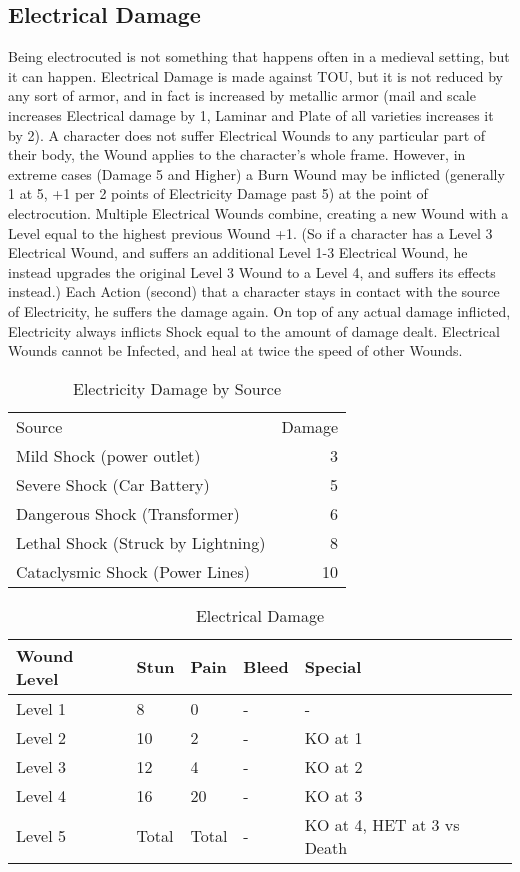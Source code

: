 \documentclass[oneside,11pt,english]{book}
\begin{document}
\subsection{Electrical Damage}
Being electrocuted is not something that happens often in a medieval setting, but it can happen. Electrical 
Damage is made against TOU, but it is not reduced by any sort of armor, and in fact is increased by 
metallic armor (mail and scale increases Electrical damage by 1, Laminar and Plate of all varieties 
increases it by 2).
A character does not suffer Electrical Wounds to any particular part of their body, the Wound applies to 
the character’s whole frame. However, in extreme cases (Damage 5 and Higher) a Burn Wound may be 
inflicted (generally 1 at 5, +1 per 2 points of Electricity Damage past 5) at the point of electrocution. 
Multiple Electrical Wounds combine, creating a new Wound with a Level equal to the highest previous 
Wound +1. (So if a character has a Level 3 Electrical Wound, and suffers an additional Level 1-3 
Electrical Wound, he instead upgrades the original Level 3 Wound to a Level 4, and suffers its effects 
instead.)
Each Action (second) that a character stays in contact with the source of Electricity, he suffers the damage 
again.
On top of any actual damage inflicted, Electricity always inflicts Shock equal to the amount of damage 
dealt.
Electrical Wounds cannot be Infected, and heal at twice the speed of other Wounds. 


\begin{table} %
	\centering
	\caption{Electricity Damage by Source}
	\label{tab:Electricity Damage by Source}
	\begin{tabu} spread 0pt {Xr}
Source &Damage\\
Mild Shock (power outlet) &3\\
Severe Shock (Car Battery)&5\\
Dangerous Shock (Transformer) &6\\
Lethal Shock (Struck by Lightning) &8\\
Cataclysmic Shock (Power Lines) &10\\
	\end{tabu}
\end{table}

\begin{table}[!ht]
	\centering
	\caption{Electrical Damage}
	\label{wound:Electrical Damage}
	\begin{tabu} spread 0pt {X[-1,l] *{3}{X[-3,c]} X[2]}
Wound Level &Stun &Pain &Bleed &Special\\\toprule %
Level 1 &8  &0 &- &-\\
Level 2 &10 &2 &- &KO at 1\\
Level 3 &12 &4 &- &KO at 2\\
Level 4 &16 &20 &-&KO at 3\\
Level 5 &Total &Total &- &KO at 4, HET at 3 vs Death\\
	\end{tabu}
\end{table}
\end{document}
